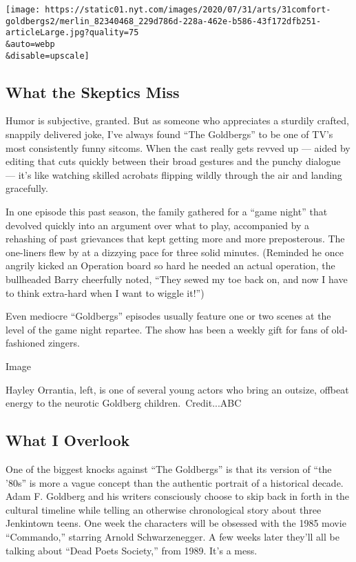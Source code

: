 \texttt{[image: https://static01.nyt.com/images/2020/07/31/arts/31comfort-goldbergs2/merlin\_82340468\_229d786d-228a-462e-b586-43f172dfb251-articleLarge.jpg?quality=75\\\&auto=webp\\\&disable=upscale]}

\hypertarget{what-the-skeptics-miss}{%
\subsection{What the Skeptics Miss}\label{what-the-skeptics-miss}}

Humor is subjective, granted. But as someone who appreciates a sturdily
crafted, snappily delivered joke, I've always found ``The Goldbergs'' to
be one of TV's most consistently funny sitcoms. When the cast really
gets revved up --- aided by editing that cuts quickly between their
broad gestures and the punchy dialogue --- it's like watching skilled
acrobats flipping wildly through the air and landing gracefully.

In one episode this past season, the family gathered for a ``game
night'' that devolved quickly into an argument over what to play,
accompanied by a rehashing of past grievances that kept getting more and
more preposterous. The one-liners flew by at a dizzying pace for three
solid minutes. (Reminded he once angrily kicked an Operation board so
hard he needed an actual operation, the bullheaded Barry cheerfully
noted, ``They sewed my toe back on, and now I have to think extra-hard
when I want to wiggle it!'')

Even mediocre ``Goldbergs'' episodes usually feature one or two scenes
at the level of the game night repartee. The show has been a weekly gift
for fans of old-fashioned zingers.

Image

Hayley Orrantia, left, is one of several young actors who bring an
outsize, offbeat energy to the neurotic Goldberg children.~Credit...ABC

\hypertarget{what-i-overlook}{%
\subsection{What I Overlook}\label{what-i-overlook}}

One of the biggest knocks against ``The Goldbergs'' is that its version
of ``the '80s'' is more a vague concept than the authentic portrait of a
historical decade. Adam F. Goldberg and his writers consciously choose
to skip back in forth in the cultural timeline while telling an
otherwise chronological story about three Jenkintown teens. One week the
characters will be obsessed with the 1985 movie ``Commando,'' starring
Arnold Schwarzenegger. A few weeks later they'll all be talking about
``Dead Poets Society,'' from 1989. It's a mess.

